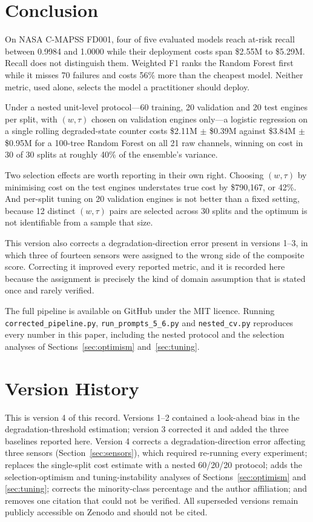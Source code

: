 \documentclass[10pt,twocolumn]{article}
\begin{document}
\section{Conclusion}

On NASA C-MAPSS FD001, four of five evaluated models reach at-risk recall between 0.9984
and 1.0000 while their deployment costs span \$2.55M to \$5.29M. Recall does not
distinguish them. Weighted F1 ranks the Random Forest first while it misses 70 failures
and costs 56\% more than the cheapest model. Neither metric, used alone, selects the
model a practitioner should deploy.

Under a nested unit-level protocol---60 training, 20 validation and 20 test engines per
split, with $(w,\tau)$ chosen on validation engines only---a logistic regression on a
single rolling degraded-state counter costs \$2.11M $\pm$ \$0.39M against \$3.84M $\pm$
\$0.95M for a 100-tree Random Forest on all 21 raw channels, winning on cost in 30 of 30
splits at roughly 40\% of the ensemble's variance.

Two selection effects are worth reporting in their own right. Choosing $(w,\tau)$ by
minimising cost on the test engines understates true cost by \$790,167, or 42\%. And
per-split tuning on 20 validation engines is not better than a fixed setting, because 12
distinct $(w,\tau)$ pairs are selected across 30 splits and the optimum is not
identifiable from a sample that size.

This version also corrects a degradation-direction error present in versions 1--3, in
which three of fourteen sensors were assigned to the wrong side of the composite score.
Correcting it improved every reported metric, and it is recorded here because the
assignment is precisely the kind of domain assumption that is stated once and rarely
verified.

The full pipeline is available on GitHub under the MIT licence. Running
\texttt{corrected\_pipeline.py}, \texttt{run\_prompts\_5\_6.py} and
\texttt{nested\_cv.py} reproduces every number in this paper, including the nested
protocol and the selection analyses of Sections~\ref{sec:optimism}
and~\ref{sec:tuning}.

\section*{Version History}
This is version 4 of this record. Versions 1--2 contained a look-ahead bias in the
degradation-threshold estimation; version 3 corrected it and added the three baselines
reported here. Version 4 corrects a degradation-direction error affecting three sensors
(Section~\ref{sec:sensors}), which required re-running every experiment; replaces the
single-split cost estimate with a nested 60/20/20 protocol; adds the selection-optimism
and tuning-instability analyses of Sections~\ref{sec:optimism} and \ref{sec:tuning};
corrects the minority-class percentage and the author affiliation; and removes one
citation that could not be verified. All superseded versions remain publicly accessible
on Zenodo and should not be cited.
\end{document}
